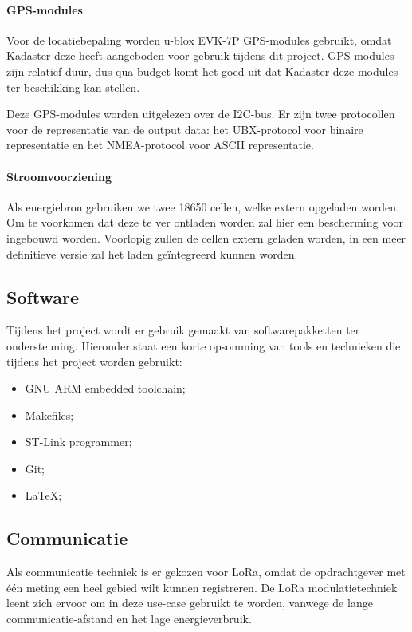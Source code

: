 \paragraph{GPS-modules}
Voor de locatiebepaling worden u-blox EVK-7P GPS-modules gebruikt, omdat Kadaster deze heeft aangeboden voor gebruik tijdens dit project. GPS-modules zijn relatief duur, dus qua budget komt het goed uit dat Kadaster deze modules ter beschikking kan stellen.

Deze GPS-modules worden uitgelezen over de I2C-bus. Er zijn twee protocollen voor de representatie van de output data: het UBX-protocol voor binaire representatie en het NMEA-protocol voor ASCII representatie.

\paragraph{Stroomvoorziening}
Als energiebron gebruiken we twee 18650 cellen, welke extern opgeladen worden.
Om te voorkomen dat deze te ver ontladen worden zal hier een bescherming voor
ingebouwd worden. Voorlopig zullen de cellen extern geladen worden, in een meer
definitieve versie zal het laden geïntegreerd kunnen worden.

\subsection{Software}
Tijdens het project wordt er gebruik gemaakt van softwarepakketten ter ondersteuning. Hieronder staat een korte opsomming van tools en technieken die tijdens het project worden gebruikt:
\begin{itemize}
    \item GNU ARM embedded toolchain;
    \item Makefiles;
    \item ST-Link programmer;
    \item Git;
    \item \LaTeX;
\end{itemize}

\subsection{Communicatie}
Als communicatie techniek is er gekozen voor LoRa, omdat de opdrachtgever met één meting een heel gebied wilt kunnen registreren. De LoRa modulatietechniek leent zich ervoor om in deze use-case gebruikt te worden, vanwege de lange communicatie-afstand en het lage energieverbruik.

